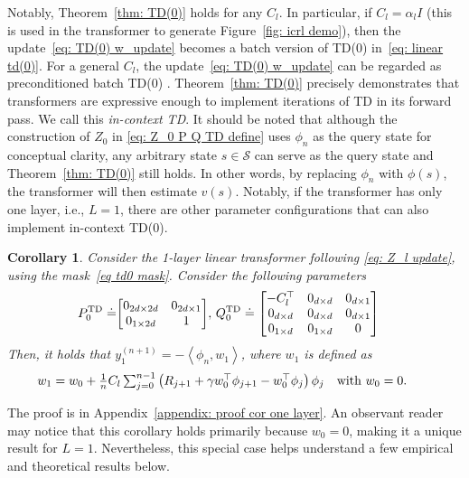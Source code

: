 \documentclass{article}
\newcommand{\indot}[2]{{\left<#1, #2\right>}}
\newcommand{\td}{\text{TD}}
\newtheorem{corollary}{Corollary}
\begin{document}
Notably, Theorem~\ref{thm: TD(0)} holds for any $C_l$.
In particular,
if $C_l = \alpha_l I$ (this is used in the transformer to generate Figure~\ref{fig: icrl demo}),
then the update~\eqref{eq: TD(0) w_update} becomes a batch version of TD(0) in~\eqref{eq: linear td(0)}.
For a general $C_l$,
the update~\eqref{eq: TD(0) w_update} can be regarded as preconditioned batch TD(0) \citep{yao2008preconditioned}.
Theorem~\ref{thm: TD(0)} precisely demonstrates that transformers are expressive enough to implement iterations of TD in its forward pass.
We call this \emph{in-context TD}.
It should be noted that although the construction of $Z_0$ in \eqref{eq: Z_0 P Q TD define} uses $\phi_n$ as the query state for conceptual clarity, any arbitrary state $s \in \mathcal{S}$ can serve as the query state and Theorem~\ref{thm: TD(0)} still holds.
In other words, by replacing $\phi_n$ with $\phi(s)$,
the transformer will then estimate $v(s)$.
Notably,
if the transformer has only one layer, i.e., $L=1$,
there are other parameter configurations that can also implement in-context TD(0).
\begin{corollary}
    \label{cor one layer}
    Consider the 1-layer linear transformer following \eqref{eq: Z_l update}, using the mask~\eqref{eq td0 mask}.
    Consider the following parameters
    \begin{align}
        \label{eq pq one layer}
        P_0^{\td} \doteq& \mqty[0_{2d \times 2d} & 0_{2d \times 1} \\ 0_{1 \times 2d} & 1], \,    Q_0^{\td} \doteq \mqty[-C_l^\top & 0_{d\times d} & 0_{d \times 1} \\ 0_{d \times d} & 0_{d \times d} & 0_{d \times 1} \\ 0_{1 \times d} & 0_{1 \times d} & 0]
    \end{align}
    Then, it holds that $y_1^{(n+1)} =  - \indot{\phi_n}{w_1}$,
    where $w_1$ is defined as
    \begin{align}
     w_{1} &\textstyle = w_0 + \frac{1}{n} C_l \sum_{j=0}^{n-1}  \left(R_{j+1} + \gamma w_0^\top\phi_{j+1} - w_0^\top\phi_j\right)\phi_j \qq{with $w_0 = 0$.}
    \end{align}
\end{corollary}
The proof is in Appendix~\ref{appendix: proof cor one layer}. An observant reader may notice that this corollary holds primarily because $w_0 = 0$, making it a unique result for $L=1$.
Nevertheless,
this special case helps understand a few empirical and theoretical results below.
\end{document}
